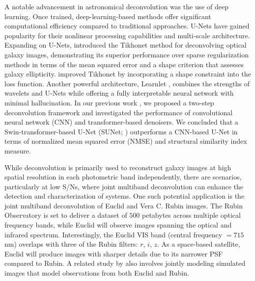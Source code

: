 \documentclass[traditabstract]{aa}
\begin{document}
A notable advancement in astronomical deconvolution was the use of deep learning. Once trained, deep-learning-based methods offer significant computational efficiency compared to traditional approaches. U-Nets \citep{ronnenberger2015unet} have gained popularity for their nonlinear processing capabilities and multi-scale architecture. Expanding on U-Nets, \cite{sureau2020} introduced the Tikhonet method for deconvolving optical galaxy images, demonstrating its superior performance over sparse regularization methods in terms of the mean squared error and a shape criterion that assesses galaxy ellipticity. \citet{shapenet} improved Tikhonet by incorporating a shape constraint into the loss function. Another powerful architecture, Learnlet \citep{ramzi:hal-03346892}, combines the strengths of wavelets and U-Nets while offering a fully interpretable neural network with minimal hallucination. In our previous work \citep{akhaury2022, sunet_akhaury}, we proposed a two-step deconvolution framework and investigated the performance of convolutional neural network (CNN) and transformer-based denoisers. We concluded that a Swin-transformer-based U-Net (SUNet; \citealt{sunet}) outperforms a CNN-based U-Net \citep{ronnenberger2015unet} in terms of normalized mean squared error (NMSE) and structural similarity index measure.

While deconvolution is primarily used to reconstruct galaxy images at high spatial resolution in each photometric band independently, there are scenarios, particularly at low S/Ns, where joint multiband deconvolution can enhance the detection and characterization of systems. One such potential application is the joint multiband deconvolution of Euclid and Vera C. Rubin images. The Rubin Observatory is set to deliver a dataset of $500$ petabytes across multiple optical frequency bands, while Euclid will observe images spanning the optical and infrared spectrum. Interestingly, the Euclid VIS band (central frequency $= 715$ nm) overlaps with three of the Rubin filters: $r$, $i$, $z$. As a space-based satellite, Euclid will produce images with sharper details due to its narrower PSF compared to Rubin. A related study by \cite{josephmelchior2021} also involves jointly modeling simulated images that model observations from both Euclid and Rubin.
\end{document}
